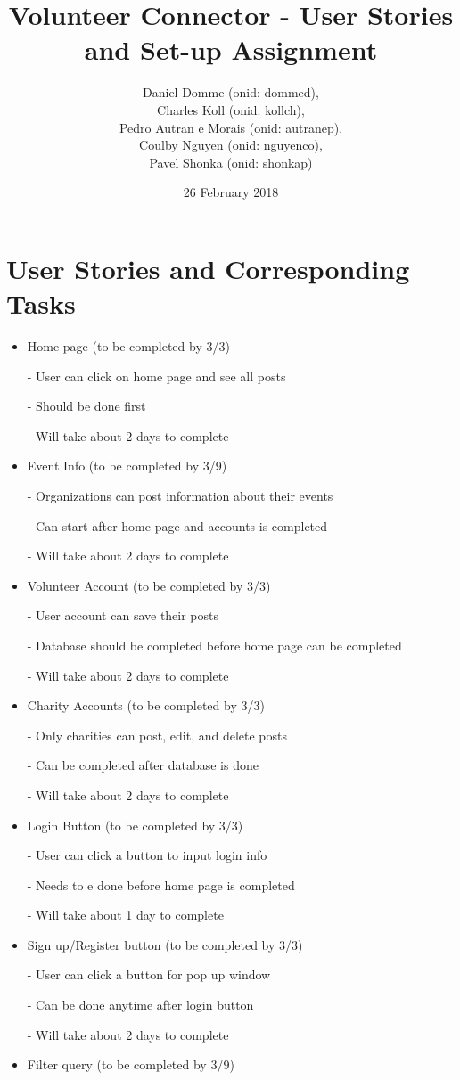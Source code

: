 \documentclass[12pt]{article}
\title{Volunteer Connector - User Stories and Set-up Assignment}
\author{Daniel Domme (onid: dommed), \\
Charles Koll (onid: kollch), \\
Pedro Autran e Morais (onid: autranep), \\
Coulby Nguyen (onid: nguyenco), \\
Pavel Shonka (onid: shonkap)
}
\date{26 February 2018}
\begin{document}
\maketitle
\tableofcontents

\pagebreak
\section{User Stories and Corresponding Tasks}
\begin{itemize}
\item
	Home page (to be completed by 3/3)

	- User can click on home page and see all posts

	- Should be done first

	- Will take about 2 days to complete
\item
	Event Info (to be completed by 3/9)

	- Organizations can post information about their events

	- Can start after home page and accounts is completed

	- Will take about 2 days to complete
\item
	Volunteer Account (to be completed by 3/3)

	- User account can save their posts

	- Database should be completed before home page can be completed

	- Will take about 2 days to complete
\item
	Charity Accounts (to be completed by 3/3)

	- Only charities can post, edit, and delete posts

	- Can be completed after database is done

	- Will take about 2 days to complete
\item
	Login Button (to be completed by 3/3)

	- User can click a button to input login info

	- Needs to e done before home page is completed

	- Will take about 1 day to complete
\item
	Sign up/Register button (to be completed by 3/3)

	- User can click a button for pop up window

	- Can be done anytime after login button

	- Will take about 2 days to complete
\item
	Filter query (to be completed by 3/9)


\end{itemize}
\end{document}
